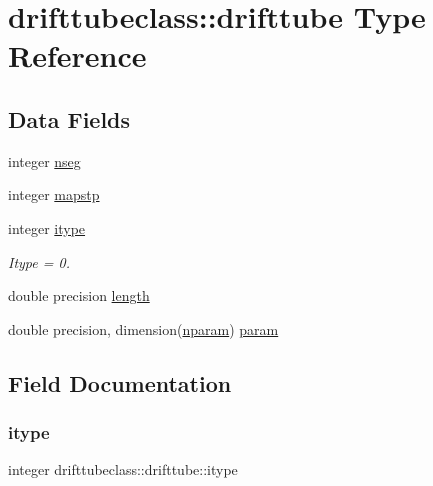 \hypertarget{structdrifttubeclass_1_1drifttube}{}\section{drifttubeclass\+::drifttube Type Reference}
\label{structdrifttubeclass_1_1drifttube}
\subsection*{Data Fields}
\begin{DoxyCompactItemize}
\item 
integer \mbox{\hyperlink{structdrifttubeclass_1_1drifttube_ac9c97374879fd6cd44d8ff391152ce6f}{nseg}}
\item 
integer \mbox{\hyperlink{structdrifttubeclass_1_1drifttube_a32a529cb8bf2da679620c46a2ac0bd6d}{mapstp}}
\item 
integer \mbox{\hyperlink{structdrifttubeclass_1_1drifttube_a1155bc20a840fce9a823eba951439db2}{itype}}
\begin{DoxyCompactList}\small\item\em Itype = 0. \end{DoxyCompactList}\item 
double precision \mbox{\hyperlink{structdrifttubeclass_1_1drifttube_afec6676520da9cf2c2dd6a8298f8577b}{length}}
\item 
double precision, dimension(\mbox{\hyperlink{namespacedrifttubeclass_af382d7cef81496c1d2c2bf3ba72c4350}{nparam}}) \mbox{\hyperlink{structdrifttubeclass_1_1drifttube_abc755647bb29543bf6f4d65f7af740d4}{param}}
\end{DoxyCompactItemize}


\subsection{Field Documentation}
\mbox{\label{structdrifttubeclass_1_1drifttube_a1155bc20a840fce9a823eba951439db2}} 
\subsubsection{\texorpdfstring{itype}{itype}}
{\footnotesize\ttfamily integer drifttubeclass\+::drifttube\+::itype}



